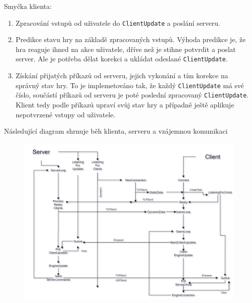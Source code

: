 \documentclass[a4paper,hidelinks]{report}
\begin{document}
Smyčka klienta:
\begin{enumerate}
	\item Zpracování vstupů od uživatele do \texttt{ClientUpdate} a poslání serveru.
	\item Predikce stavu hry na základě zpracovaných vstupů. Výhoda predikce je, že hra reaguje ihned na akce uživatele, dříve než je stihne potvrdit a poslat server. Ale je potřeba dělat korekci a ukládat odeslané \texttt{ClientUpdate}.
	\item Získání přijatých příkazů od serveru, jejich vykonání a tím korekce na správný stav hry. To je implemetováno tak, že každý \texttt{ClientUpdate} má své číslo, součástí příkazů od serveru je poté poslední zpracovaný \texttt{ClientUpdate}. Klient tedy podle příkazů upraví svůj stav hry a případně ještě aplikuje nepotvrzené vstupy od uživatele.
\end{enumerate}
Následující diagram shrnuje běh klienta, serveru a vzájemnou komunikaci
\FloatBarrier
\begin{figure}[h!]
	\includegraphics[width=\textwidth]{diagram.png}
\end{figure}
\end{document}
